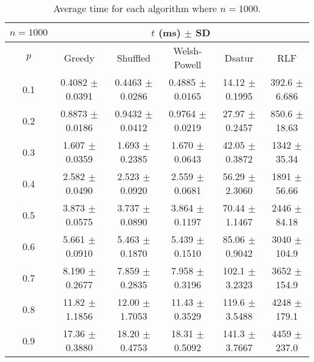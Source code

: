 \begin{table}[H]
    \centering
    \begin{tabular}{cccccc}
        
        $n = 1000$& \multicolumn{5}{c}{$t$ (\unit{ms}) $\pm$ SD} \\
        \hline
        $p$ & Greedy & Shuffled & Welsh-Powell & Dsatur & RLF \\
        \hline
        0.1 & 0.4082 $\pm$ 0.0391 & 0.4463 $\pm$ 0.0286 & 0.4885 $\pm$ 0.0165 & 14.12 $\pm$ 0.1995 & 392.6 $\pm$ 6.686 \\
        0.2 & 0.8873 $\pm$ 0.0186 & 0.9432 $\pm$ 0.0412 & 0.9764 $\pm$ 0.0219 & 27.97 $\pm$ 0.2457 & 850.6 $\pm$ 18.63 \\
        0.3 & 1.607 $\pm$ 0.0359 & 1.693 $\pm$ 0.2385 & 1.670 $\pm$ 0.0643 & 42.05 $\pm$ 0.3872 & 1342 $\pm$ 35.34 \\
        0.4 & 2.582 $\pm$ 0.0490 & 2.523 $\pm$ 0.0920 & 2.559 $\pm$ 0.0681 & 56.29 $\pm$ 2.3060 & 1891 $\pm$ 56.66 \\
        0.5 & 3.873 $\pm$ 0.0575 & 3.737 $\pm$ 0.0890 & 3.864 $\pm$ 0.1197 & 70.44 $\pm$ 1.1467 & 2446 $\pm$ 84.18 \\
        0.6 & 5.661 $\pm$ 0.0910 & 5.463 $\pm$ 0.1870 & 5.439 $\pm$ 0.1510 & 85.06 $\pm$ 0.9042 & 3040 $\pm$ 104.9 \\
        0.7 & 8.190 $\pm$ 0.2677 & 7.859 $\pm$ 0.2835 & 7.958 $\pm$ 0.3196 & 102.1 $\pm$ 3.2323 & 3652 $\pm$ 154.9 \\
        0.8 & 11.82 $\pm$ 1.1856 & 12.00 $\pm$ 1.7053 & 11.43 $\pm$ 0.3529 & 119.6 $\pm$ 3.5488 & 4248 $\pm$ 179.1 \\
        0.9 & 17.36 $\pm$ 0.3880 & 18.20 $\pm$ 0.4753 & 18.31 $\pm$ 0.5092 & 141.3 $\pm$ 3.7667 & 4459 $\pm$ 237.0 \\
    
        \hline
    \end{tabular}
    \caption{Average time for each algorithm where $n = 1000$.}
    \label{tab:avgTimeforV1000}
\end{table}



